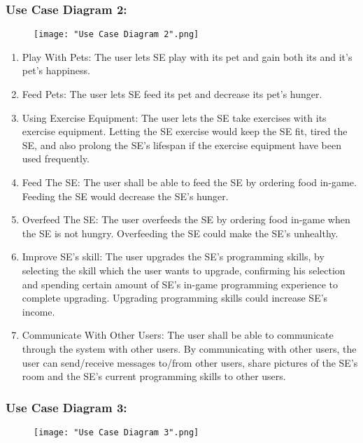 \documentclass[]{article}
\begin{document}
\subsubsection*{Use Case Diagram 2:}
\begin{figure}[H]
    \centering
    \texttt{[image: "Use Case Diagram 2".png]}
\end{figure}

\begin{enumerate}
    \item Play With Pets: The user lets SE play with its pet and gain both its 
    and it's pet’s happiness.
    \item Feed Pets: The user lets SE feed its pet and decrease its pet’s hunger.
    \item Using Exercise Equipment: The user lets the SE take exercises with 
    its exercise equipment. Letting the SE exercise would keep the SE fit, 
    tired the SE, and also prolong the SE’s lifespan if the exercise equipment 
    have been used frequently.
    \item Feed The SE: The user shall be able to feed the SE by ordering food 
    in-game. Feeding the SE would decrease the SE’s hunger. 
    \item Overfeed The SE: The user overfeeds the SE by ordering food in-game 
    when the SE is not hungry. Overfeeding the SE could make the SE’s unhealthy.
    \item Improve SE’s skill: The user upgrades the SE’s programming skills, 
    by selecting the skill which the user wants to upgrade, confirming his 
    selection and spending certain amount of SE’s in-game programming experience 
    to complete upgrading. Upgrading programming skills could increase SE’s income.
    \item Communicate With Other Users: The user shall be able to communicate 
    through the system with other users. By communicating with other users, the 
    user can send/receive messages to/from other users, share pictures of the 
    SE’s room and the SE’s current programming skills to other users.
\end{enumerate}

\subsubsection*{Use Case Diagram 3:}
\begin{figure}[H]
    \centering
    \texttt{[image: "Use Case Diagram 3".png]}
\end{figure}
\end{document}
